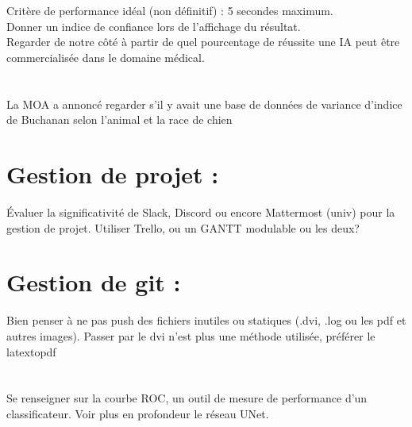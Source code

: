 \documentclass{article}
\begin{document}
\section*{}
Critère de performance idéal (non définitif) : 5 secondes maximum.\\
Donner un indice de confiance lors de l’affichage du résultat.\\
Regarder de notre côté à partir de quel pourcentage de réussite une IA peut être commercialisée dans le domaine médical.

\section*{}
La MOA a annoncé regarder s’il y avait une base de données de variance d’indice de Buchanan selon l’animal et la race de chien


\section*{Gestion de projet :}
Évaluer la significativité de Slack, Discord ou encore Mattermost (univ) pour la gestion de projet. 
Utiliser Trello, ou un GANTT modulable ou les deux?

\section*{Gestion de git :}
Bien penser à ne pas push des fichiers inutiles ou statiques (.dvi, .log ou les pdf et autres images). Passer par le dvi n’est plus une méthode utilisée, préférer le latextopdf

\section*{}
Se renseigner sur la courbe ROC, un outil de mesure de performance d’un classificateur.
Voir plus en profondeur le réseau UNet.
\end{document}
